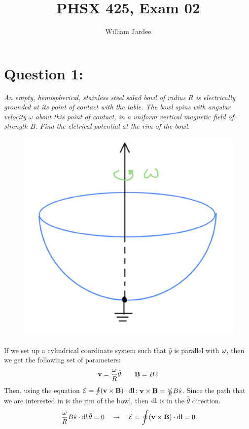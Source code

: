 \documentclass[12pt]{article}
\title{PHSX 425, Exam 02}
\author{William Jardee}
\begin{document}
\maketitle

\section*{Question 1:}
\emph{An empty, hemispherical, stainless steel salad bowl of radius $R$ is electrically grounded at its point of contact with the table. The bowl spins with angular velocity $\omega$ about this point of contact, in a uniform vertical magnetic field of strength $B$. Find the elctrical potential at the rim of the bowl.}
\begin{figure}[h]
\centering
\includegraphics[scale=.5]{exam02_question1.png}
\label{fig:1.1}
\end{figure}

If we set up a cylindrical coordinate system such that $\hat{y}$ is parallel with $\vb{\omega}$, then we get the following set of parameters:
\[\vb{v} = \frac{\omega}{R}\hat{\theta} \qquad \vb{B} = B\hat{z}\]
Then, using the equation $\mathcal{E} = \oint (\vb{v} \times \vb{B})\cdot \dd{\vb{l}}$: $\vb{v} \times \vb{B} = \frac{\omega}{R} B \hat{s}$. Since the path that we are interested in is the rim of the bowl, then $\dd{\vb{l}}$ is in the $\hat{\theta}$ direction. 
\[\frac{\omega}{R} B \hat{s} \cdot \dd{l}\hat{\theta} = 0 \quad \rightarrow \quad \mathcal{E} = \oint (\vb{v} \times \vb{B})\cdot \dd{\vb{l}} = 0\]
\end{document}
